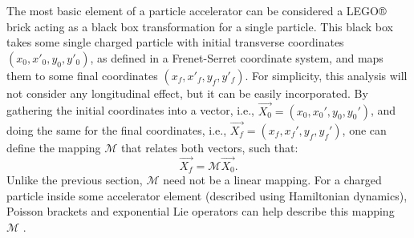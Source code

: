 The most basic element of a particle accelerator can be considered a LEGO® brick acting as a black box transformation for a single particle. This black box takes some single charged particle with initial transverse coordinates $\left( x_0,x'_0,y_0,y'_0 \right)$, as defined in a Frenet-Serret coordinate system, and maps them to some final coordinates $\left( x_f,x'_f,y_f,y'_f \right)$. For simplicity, this analysis will not consider any longitudinal effect, but it can be easily incorporated. By gathering the initial coordinates into a vector, i.e., $\vec{X_0} = \left( x_0,x_0',y_0,y_0' \right)$, and doing the same for the final coordinates, i.e., $\vec{X_f} = \left( x_f,x_f',y_f,y_f' \right)$, one can define the mapping $\mathcal{M}$ that relates both vectors, such that:  
\begin{equation}
\label{eq:ch2map}
\vec{X_f}=\mathcal{M}\vec{X_0}.
\end{equation}
Unlike the previous section, $\mathcal{M}$ need not be a linear mapping. For a charged particle inside some accelerator element (described using Hamiltonian dynamics), Poisson brackets and exponential Lie operators can help describe this mapping $\mathcal{M}$ \cite{wolski,todd1,cernthesis1,cernthesis2,forest}.\\

